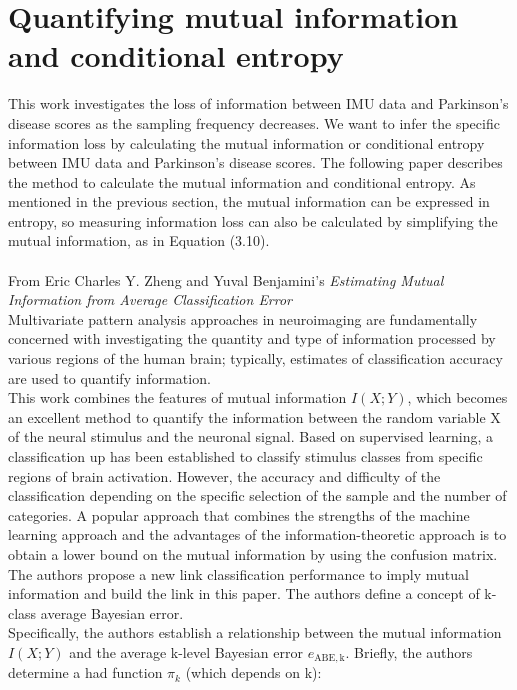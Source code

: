 \section{Quantifying mutual information and conditional entropy}
This work investigates the loss of information between IMU data and Parkinson's disease scores as the sampling frequency decreases. We want to infer the specific information loss by calculating the mutual information or conditional entropy between IMU data and Parkinson's disease scores. The following paper describes the method to calculate the mutual information and conditional entropy. As mentioned in the previous section, the mutual information can be expressed in entropy, so measuring information loss can also be calculated by simplifying the mutual information, as in Equation (3.10).
\\ \hspace*{\fill} \\
From Eric Charles Y. Zheng and Yuval Benjamini's \emph{Estimating Mutual Information from Average Classification Error} \cite{zheng2016estimating}\\
Multivariate pattern analysis approaches in neuroimaging are fundamentally concerned with investigating the quantity and type of information processed by various regions of the human brain; typically, estimates of classification accuracy are used to quantify information. \\
This work combines the features of mutual information $I(X; Y)$, which becomes an excellent method to quantify the information between the random variable X of the neural stimulus and the neuronal signal. Based on supervised learning, a classification up has been established to classify stimulus classes from specific regions of brain activation. However, the accuracy and difficulty of the classification depending on the specific selection of the sample and the number of categories.
A popular approach that combines the strengths of the machine learning approach and the advantages of the information-theoretic approach is to obtain a lower bound on the mutual information by using the confusion matrix. The authors propose a new link classification performance to imply mutual information and build the link in this paper. The authors define a concept of k-class average Bayesian error. \\
Specifically, the authors establish a relationship between the mutual information $I (X; Y)$ and the average k-level Bayesian error $e_{\mathrm {ABE,k} }$. Briefly, the authors determine a had function $\pi _{k} $ (which depends on k):
